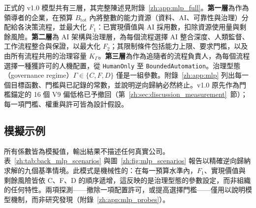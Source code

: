 正式的 v1.0 模型共有三層，其完整陳述見附錄~\ref{zh:app:mlp_full}。\textbf{第一層}為作為領導者的企業，在預算 $B_{\mathrm{tot}}$ 內將整數的能力資源（資料、AI、可靠性與治理）分配給各決策流程，並最大化 $F_1$：已實現價值與 AI 採用數，扣除資源使用量與剩餘風險。\textbf{第二層}為 AI 架構與治理層，為每個流程選擇 AI 整合深度、人類監督、工作流程整合與保證，以最大化 $F_2$；其限制條件包括能力上限、要求門檻，以及由所有流程共用的治理容量 $K_\Gamma$。\textbf{第三層}為作為追隨者的流程負責人，為每個流程選擇一種獲許可的人機配置，從 \texttt{HumanOnly} 至 \texttt{BoundedAutomation}。治理型態（governance regime）$\Gamma\in\{C,F,D\}$ 僅是一組參數。附錄~\ref{zh:app:mlp} 列出每一個目標函數、門檻與已記錄的常數，並說明逆向歸納必然終止。v1.0 原先作為門檻錨定的 16 個 V9 偏低格已予撤回（第~\ref{zh:sec:discussion_measurement}~節）；每一項門檻、權重與許可皆為設計假設。

\subsection{模擬示例}
\label{zh:sec:mlp_sim}

所有係數皆為模擬值，輸出結果不描述任何真實公司。表~\ref{zh:tab:back_mlp_scenarios} 與圖~\ref{zh:fig:mlp_scenarios} 報告以精確逆向歸納求解的九個基準情境。此模式是機械性的：在每一預算水準內，$F_1$、實現價值與剩餘風險皆依 C、F、D 的順序遞增，這反映的是治理型態的參數設定，而非組織的任何特性。兩項探測——撤除一項配置許可，或提高選擇門檻——僅用以說明模型機制，而非研究發現（附錄~\ref{zh:app:mlp_probes}）。

